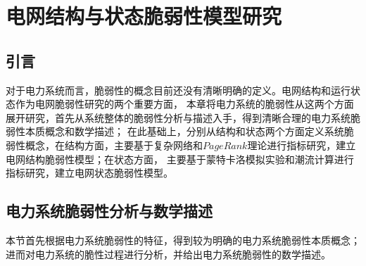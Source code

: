 \chapter{电网结构与状态脆弱性模型研究}
\label{cha:theory}

\section{引言}
\label{sec:index3}

对于电力系统而言，脆弱性的概念目前还没有清晰明确的定义。电网结构和运行状态作为电网脆弱性研究的两个重要方面，
本章将电力系统的脆弱性从这两个方面展开研究，首先从系统整体的脆弱性分析与描述入手，得到清晰合理的电力系统脆弱性本质概念和数学描述；
在此基础上，分别从结构和状态两个方面定义系统脆弱性概念，在结构方面，主要基于复杂网络和$PageRank$理论进行指标研究，建立电网结构脆弱性模型；在状态方面，
主要基于蒙特卡洛模拟实验和潮流计算进行指标研究，建立电网状态脆弱性模型。

\section{电力系统脆弱性分析与数学描述}
\label{sec:defina}

本节首先根据电力系统脆弱性的特征，得到较为明确的电力系统脆弱性本质概念；进而对电力系统的脆性过程进行分析，并给出电力系统脆弱性的数学描述。




